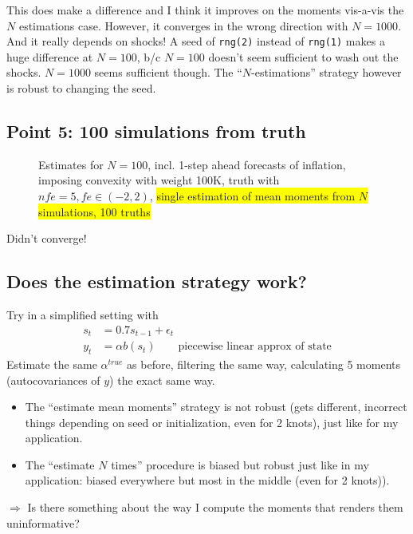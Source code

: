 \documentclass[11pt]{article}
\def \myFigPath {../../figures/}
\renewcommand{\[}{\begin{equation}}
\renewcommand{\]}{\end{equation}}
\def\myBiggerFigScale{0.4}
\def\myTinyFigScale{0.16}
\begin{document}
This does make a difference and I think it improves on the moments vis-a-vis the $N$ estimations case. However, it converges in the wrong direction with $N=1000$. And it really depends on shocks! A seed of \texttt{rng(2)} instead of \texttt{rng(1)} makes a huge difference at $N=100$, b/c $N=100$ doesn't seem sufficient to wash out the shocks. $N=1000$ seems sufficient though. The ``$N$-estimations'' strategy however is robust to changing the seed. 


\clearpage
\subsection{Point 5: 100 simulations from truth}


\begin{figure}[h!]
{}
\caption{Estimates for $N=100$,  incl. 1-step ahead forecasts of inflation, imposing convexity with weight 100K, truth with $nfe=5, fe \in(-2,2)$, \colorbox{yellow}{single estimation of mean moments from $N$ simulations, 100 truths}}
\end{figure}
Didn't converge!

\newpage
\subsection{Does the estimation strategy work?}
Try in a simplified setting with
\begin{align}
s_t & = 0.7 s_{t-1} + \epsilon_t \\
y_t & = \alpha b(s_t) \quad \quad \text{piecewise linear approx of state}
\end{align}
Estimate the same $\alpha^{true}$ as before, filtering the same way, calculating 5 moments (autocovariances of $y$) the exact same way.
\begin{itemize}
\item The ``estimate mean moments'' strategy is not robust (gets different, incorrect things depending on seed or initialization, even for 2 knots), just like for my application.
\item The ``estimate $N$ times'' procedure is biased but robust just like in my application: biased everywhere but most in the middle (even for 2 knots)). 
\end{itemize}
$\Rightarrow$ Is there something about the way I compute the moments that renders them uninformative?
\end{document}
